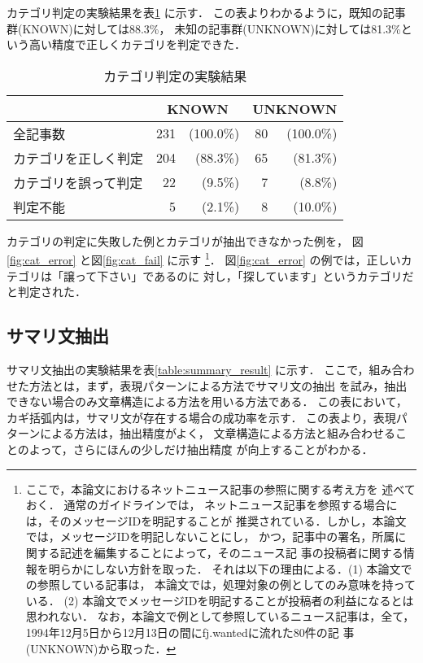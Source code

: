 カテゴリ判定の実験結果を表\ref{table:cat_result} に示す．
この表よりわかるように，既知の記事群(KNOWN)に対しては88.3\%，
未知の記事群(UNKNOWN)に対しては81.3\%という高い精度で正しくカテゴリを判定できた．

\begin{table}
\caption{カテゴリ判定の実験結果}
\label{table:cat_result}
\begin{center}
\begin{tabular}{|l|rr|rr|} \hline
                     & \multicolumn{2}{c|}{KNOWN} & \multicolumn{2}{c|}{UNKNOWN}  \\ \hline
全記事数             & 231 & (100.0\%)  & 80 & (100.0\%) \\ \hline
カテゴリを正しく判定 & 204 & (88.3\%) & 65 & (81.3\%) \\ 
カテゴリを誤って判定 &  22 & (9.5\%)  & 7  & (8.8\%) \\
判定不能             &   5 & (2.1\%)  &  8 & (10.0\%) \\ \hline
\end{tabular}
\end{center}
\end{table}

カテゴリの判定に失敗した例とカテゴリが抽出できなかった例を，
図\ref{fig:cat_error} と図\ref{fig:cat_fail} に示す
\footnote{ここで，本論文におけるネットニュース記事の参照に関する考え方を
述べておく．
通常のガイドラインでは，
ネットニュース記事を参照する場合には，そのメッセージIDを明記することが
推奨されている．しかし，本論文では，メッセージIDを明記しないことにし，
かつ，記事中の署名，所属に関する記述を編集することによって，そのニュース記
事の投稿者に関する情報を明らかにしない方針を取った．
それは以下の理由による．(1) 本論文での参照している記事は，
本論文では，処理対象の例としてのみ意味を持っている．
(2) 本論文でメッセージIDを明記することが投稿者の利益になるとは思われない．
なお，本論文で例として参照しているニュース記事は，全て，
1994年12月5日から12月13日の間にfj.wantedに流れた80件の記
事(UNKNOWN)から取った．
}．
図\ref{fig:cat_error} の例では，正しいカテゴリは「譲って下さい」であるのに
対し，「探しています」というカテゴリだと判定された．



\subsection{サマリ文抽出}

サマリ文抽出の実験結果を表\ref{table:summary_result} に示す．
ここで，組み合わせた方法とは，まず，表現パターンによる方法でサマリ文の抽出
を試み，抽出できない場合のみ文章構造による方法を用いる方法である．
この表において，カギ括弧内は，サマリ文が存在する場合の成功率を示す．
この表より，表現パターンによる方法は，抽出精度がよく，
文章構造による方法と組み合わせることのよって，さらにほんの少しだけ抽出精度
が向上することがわかる．

